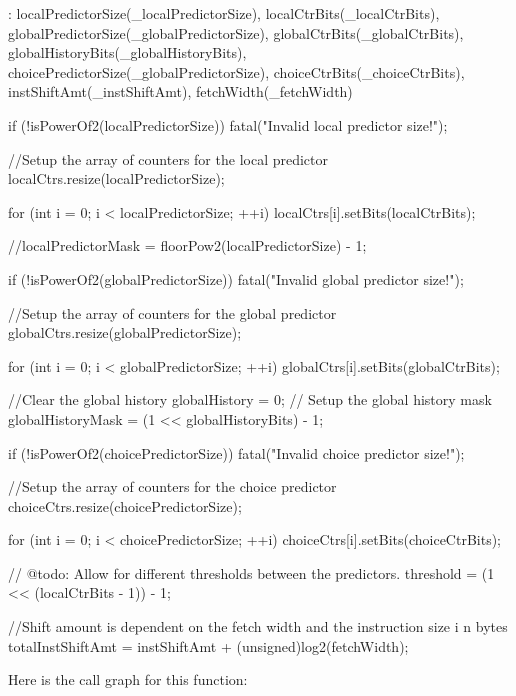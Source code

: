 \begin{DoxyCode}
    : localPredictorSize(_localPredictorSize),
      localCtrBits(_localCtrBits),
      globalPredictorSize(_globalPredictorSize),
      globalCtrBits(_globalCtrBits),
      globalHistoryBits(_globalHistoryBits),
      choicePredictorSize(_globalPredictorSize),
      choiceCtrBits(_choiceCtrBits),
      instShiftAmt(_instShiftAmt),
      fetchWidth(_fetchWidth)
{
    if (!isPowerOf2(localPredictorSize)) {
        fatal("Invalid local predictor size!\n");
    }

    //Setup the array of counters for the local predictor
    localCtrs.resize(localPredictorSize);

    for (int i = 0; i < localPredictorSize; ++i)
        localCtrs[i].setBits(localCtrBits);

    //localPredictorMask = floorPow2(localPredictorSize) - 1;

    if (!isPowerOf2(globalPredictorSize)) {
        fatal("Invalid global predictor size!\n");
    }

    //Setup the array of counters for the global predictor
    globalCtrs.resize(globalPredictorSize);

    for (int i = 0; i < globalPredictorSize; ++i)
        globalCtrs[i].setBits(globalCtrBits);

    //Clear the global history
    globalHistory = 0;
    // Setup the global history mask
    globalHistoryMask = (1 << globalHistoryBits) - 1;

    if (!isPowerOf2(choicePredictorSize)) {
        fatal("Invalid choice predictor size!\n");
    }

    //Setup the array of counters for the choice predictor
    choiceCtrs.resize(choicePredictorSize);

    for (int i = 0; i < choicePredictorSize; ++i)
        choiceCtrs[i].setBits(choiceCtrBits);

    // @todo: Allow for different thresholds between the predictors.
    threshold = (1 << (localCtrBits - 1)) - 1;

        //Shift amount is dependent on the fetch width and the instruction size i
      n bytes
        totalInstShiftAmt = instShiftAmt + (unsigned)log2(fetchWidth);
}
\end{DoxyCode}


Here is the call graph for this function:




